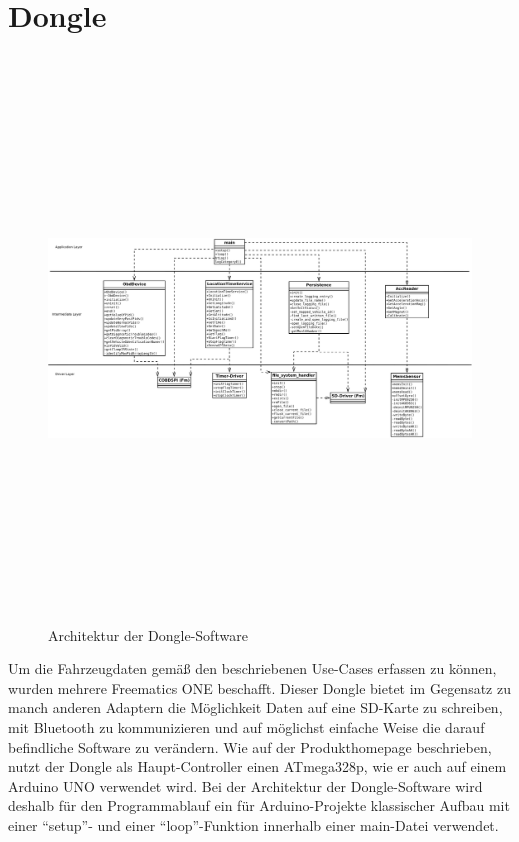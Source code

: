\section{Dongle}
\begin{figure}
  \begin{center}
    \includegraphics[width=\textwidth,height=15cm,keepaspectratio]{./img/Dongle_Arch_final}
    \caption{Architektur der Dongle-Software}
    \label{fig:dongleArch}
  \end{center}
\end{figure}
Um die Fahrzeugdaten gemäß den beschriebenen Use-Cases erfassen zu können, wurden mehrere Freematics ONE beschafft. Dieser Dongle bietet im Gegensatz zu manch anderen Adaptern die Möglichkeit Daten auf eine SD-Karte zu schreiben, mit Bluetooth zu kommunizieren und auf möglichst einfache Weise die darauf befindliche Software zu verändern. Wie auf der Produkthomepage beschrieben, nutzt der Dongle als Haupt-Controller einen ATmega328p, wie er auch auf einem Arduino UNO verwendet wird. Bei der Architektur der Dongle-Software wird deshalb für den Programmablauf ein für Arduino-Projekte klassischer Aufbau mit einer \enquote{setup}- und einer \enquote{loop}-Funktion innerhalb einer main-Datei verwendet.
